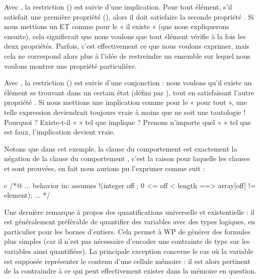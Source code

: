 Avec , la restriction
() est suivie d'une implication. Pour tout élément, s'il
satisfait une première propriété (), alors il doit satisfaire la
seconde propriété . Si nous mettions un ET comme pour le « il
existe » (que nous expliquerons ensuite), cela signifierait que nous voulons
que tout élément vérifie à la fois les deux propriétés. Parfois, c'est effectivement
ce que nous voulons exprimer, mais cela ne correspond alors plus à l'idée de
restreindre un ensemble sur lequel nous voulons montrer une propriété particulière.


Avec , la restriction
() est suivie d'une conjonction : nous voulons qu'il existe un
élément se trouvant dans un certain état (défini par ),
tout en satisfaisant l'autre propriété . Si nous mettions une
implication comme pour le « pour tout », une telle expression deviendrait
toujours vraie à moins que  ne soit une tautologie ! Pourquoi ?
Existe-t-il «  » tel que  implique  ?
Prenons n'importe quel «  » tel que  est faux,
l'implication devient vraie.


Notons que dans cet exemple, la clause  du comportement
 est exactement la négation de la clause 
du comportement , c'est la raison pour laquelle les clauses
 et  sont prouvées, en fait nous
aurions pu l'exprimer comme suit :


\begin{CodeBlock}{c}
  /*@ ...
    behavior in:
      assumes !(\forall integer off ; 0 <= off < length ==> array[off] != element);
    ...
  */
\end{CodeBlock}


Une dernière remarque à propos des quantifications universelle et
existentielle : il est généralement préférable de quantifier des variables
avec des types logiques, en particulier pour les bornes d'entiers. Cela permet
à WP de générer des formules plus simples (car il n'est pas nécessaire
d'encoder une contrainte de type sur les variables ainsi quantifiées). La
principale exception concerne le cas où la variable est supposée représenter le
contenu d'une cellule mémoire : il est alors pertinent de la contraindre à
ce qui peut effectivement exister dans la mémoire en question.


